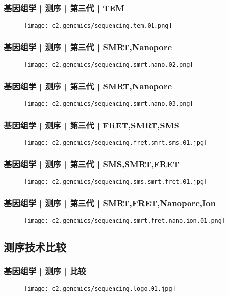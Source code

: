 \begin{frame}
  \frametitle{基因组学 | 测序 | 第三代 | TEM}
  \begin{figure}
    \centering
    \texttt{[image: c2.genomics/sequencing.tem.01.png]}
  \end{figure}
\end{frame}

\begin{frame}
  \frametitle{基因组学 | 测序 | 第三代 | SMRT,Nanopore}
  \begin{figure}
    \centering
    \texttt{[image: c2.genomics/sequencing.smrt.nano.02.png]}
  \end{figure}
\end{frame}

\begin{frame}
  \frametitle{基因组学 | 测序 | 第三代 | SMRT,Nanopore}
  \begin{figure}
    \centering
    \texttt{[image: c2.genomics/sequencing.smrt.nano.03.png]}
  \end{figure}
\end{frame}

\begin{frame}
  \frametitle{基因组学 | 测序 | 第三代 | FRET,SMRT,SMS}
  \begin{figure}
    \centering
    \texttt{[image: c2.genomics/sequencing.fret.smrt.sms.01.jpg]}
  \end{figure}
\end{frame}

\begin{frame}
  \frametitle{基因组学 | 测序 | 第三代 | SMS,SMRT,FRET}
  \begin{figure}
    \centering
    \texttt{[image: c2.genomics/sequencing.sms.smrt.fret.01.jpg]}
  \end{figure}
\end{frame}

\begin{frame}
  \frametitle{基因组学 | 测序 | 第三代 | SMRT,FRET,Nanopore,Ion}
  \begin{figure}
    \centering
    \texttt{[image: c2.genomics/sequencing.smrt.fret.nano.ion.01.png]}
  \end{figure}
\end{frame}

\subsection{测序技术比较}
\begin{frame}
  \frametitle{基因组学 | 测序 | 比较}
  \begin{figure}
    \centering
    \texttt{[image: c2.genomics/sequencing.logo.01.jpg]}
  \end{figure}
\end{frame}

